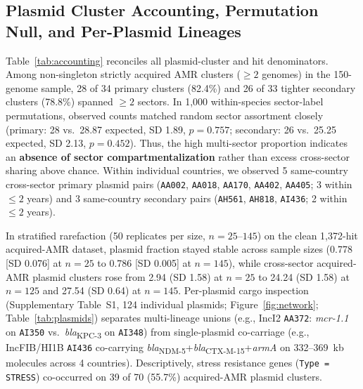 \documentclass[11pt,a4paper]{article}
\begin{document}
\subsection{Plasmid Cluster Accounting, Permutation Null, and Per-Plasmid Lineages}

Table~\ref{tab:accounting} reconciles all plasmid-cluster and hit denominators. Among non-singleton strictly acquired AMR clusters ($\ge 2$ genomes) in the 150-genome sample, 28 of 34 primary clusters (82.4\%) and 26 of 33 tighter secondary clusters (78.8\%) spanned $\ge 2$ sectors. In 1,000 within-species sector-label permutations, observed counts matched random sector assortment closely (primary: 28 vs.\ 28.87 expected, SD 1.89, $p = 0.757$; secondary: 26 vs.\ 25.25 expected, SD 2.13, $p = 0.452$). Thus, the high multi-sector proportion indicates an \textbf{absence of sector compartmentalization} rather than excess cross-sector sharing above chance. Within individual countries, we observed 5 same-country cross-sector primary plasmid pairs (\texttt{AA002}, \texttt{AA018}, \texttt{AA170}, \texttt{AA402}, \texttt{AA405}; 3 within $\le 2$ years) and 3 same-country secondary pairs (\texttt{AH561}, \texttt{AH818}, \texttt{AI436}; 2 within $\le 2$ years).

In stratified rarefaction (50 replicates per size, $n = 25$--$145$) on the clean 1,372-hit acquired-AMR dataset, plasmid fraction stayed stable across sample sizes (0.778 [SD 0.076] at $n = 25$ to 0.786 [SD 0.005] at $n = 145$), while cross-sector acquired-AMR plasmid clusters rose from 2.94 (SD 1.58) at $n = 25$ to 24.24 (SD 1.58) at $n = 125$ and 27.54 (SD 0.64) at $n = 145$. Per-plasmid cargo inspection (Supplementary Table~S1, 124 individual plasmids; Figure~\ref{fig:network}; Table~\ref{tab:plasmids}) separates multi-lineage unions (e.g., IncI2 \texttt{AA372}: \textit{mcr-1.1} on \texttt{AI350} vs.\ \textit{bla}\textsubscript{KPC-3} on \texttt{AI348}) from single-plasmid co-carriage (e.g., IncFIB/HI1B \texttt{AI436} co-carrying \textit{bla}\textsubscript{NDM-5}+\textit{bla}\textsubscript{CTX-M-15}+\textit{armA} on 332--369~kb molecules across 4 countries). Descriptively, stress resistance genes (\texttt{Type = STRESS}) co-occurred on 39 of 70 (55.7\%) acquired-AMR plasmid clusters.
\end{document}
